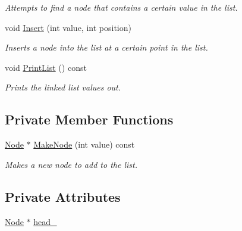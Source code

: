 \begin{DoxyCompactItemize}
\begin{DoxyCompactList}\small\item\em Attempts to find a node that contains a certain value in the list. \end{DoxyCompactList}\item 
void \hyperlink{class_c_s170_1_1_list_lab_1_1_list_a08c1c07a3356cfe4c6c7573b6af03eda}{Insert} (int value, int position)
\begin{DoxyCompactList}\small\item\em Inserts a node into the list at a certain point in the list. \end{DoxyCompactList}\item 
void \hyperlink{class_c_s170_1_1_list_lab_1_1_list_a059c0ffcb314345dd007a817537071d1}{Print\-List} () const 
\begin{DoxyCompactList}\small\item\em Prints the linked list values out. \end{DoxyCompactList}\end{DoxyCompactItemize}
\subsection*{Private Member Functions}
\begin{DoxyCompactItemize}
\item 
\hyperlink{struct_c_s170_1_1_list_lab_1_1_node}{Node} $\ast$ \hyperlink{class_c_s170_1_1_list_lab_1_1_list_afaa3089850eb49a4f608151a65ad8b29}{Make\-Node} (int value) const 
\begin{DoxyCompactList}\small\item\em Makes a new node to add to the list. \end{DoxyCompactList}\end{DoxyCompactItemize}
\subsection*{Private Attributes}
\begin{DoxyCompactItemize}
\item 
\hyperlink{struct_c_s170_1_1_list_lab_1_1_node}{Node} $\ast$ \hyperlink{class_c_s170_1_1_list_lab_1_1_list_a9fcc430ed0a61fc7d5159908da33cca1}{head\-\_\-}
\end{DoxyCompactItemize}


